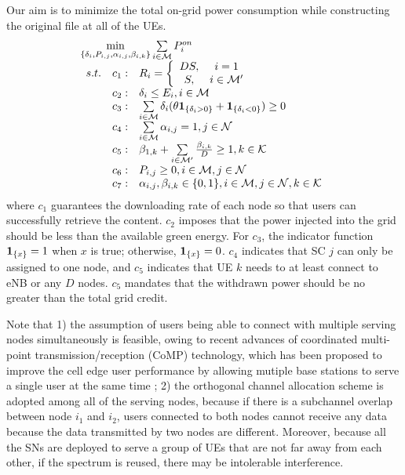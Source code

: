 \documentclass[journal,12pt,onecolumn]{IEEEtran}
\begin{document}
Our aim is to minimize the total on-grid power consumption while constructing the original file at all of the UEs. 
\begin{equation}\label{obj}
\begin{array}{l}
\mathop {\min }\limits_{\{\delta_i,{P_{i,j}},{\alpha_{i,j},\beta_{i,k}}\}}  \sum\limits_{i\in\mathcal{M}}{P_i^{on}} \\
\begin{array}{*{20}{l}}
{s.t.}&c_1:&R_i=\left\{\begin{array}{cc}
 DS,&i=1\\
 S, &i\in\mathcal{M'}\\
 \end{array}
 \right.\\
&c_2:&\delta_i\le E_i,i\in\mathcal{M}\\
&c_3:&\sum\limits_{i\in\mathcal{M}}\delta_i (\theta{\bf{1}}_{\{\delta_i>0\}}+{\bf{1}}_{\{\delta_i<0\}})\ge 0\\
&c_4:&\sum\limits_{i\in\mathcal{M}}\alpha_{i,j}=1,j\in\mathcal{N}\\
&c_5:&\beta_{1,k}+\sum\limits_{i\in\mathcal{M'}}\frac{\beta_{i,k}}{D}\ge 1, k\in\mathcal{K}\\
&c_6:&P_{i,j}\ge 0,i\in\mathcal{M},j\in\mathcal{N}\\
&c_7:&{\alpha_{i,j},\beta_{i,k}}\in\{0,1\},i\in\mathcal{M},j\in\mathcal{N},k\in\mathcal{K}\\
\end{array}
\end{array}
\end{equation}
where $c_1$ guarantees the downloading rate of each node so that users can successfully retrieve the content. $c_2$ imposes that the power injected into the grid should be less than the available green energy. For $c_3$, the indicator function ${\bf{1}}_{\{x\}} = 1$ when $x$ is true; otherwise, ${\bf{1}}_{\{x\}} = 0$. $c_4$ indicates that SC $j$ can only be assigned to one node, and $c_5$ indicates that UE $k$ needs to at least connect to eNB or any $D$ nodes. $c_5$ mandates that the withdrawn power should be no greater than the total grid credit.

Note that 1) the assumption of users being able to connect with multiple serving nodes simultaneously is feasible, owing to recent advances of coordinated multi-point transmission/reception (CoMP) technology, which has been proposed to improve the cell edge user performance by allowing mutiple base stations to serve a single user at the same time \cite{7001710}; 2) the orthogonal channel allocation scheme is adopted among all of the serving nodes, because if there is a subchannel overlap between node $i_1$ and $i_2$, users connected to both nodes cannot receive any data because the data transmitted by two nodes are different. Moreover, because all the SNs are deployed to serve a group of UEs that are not far away from each other, if the spectrum is reused, there may be intolerable interference.
\end{document}
